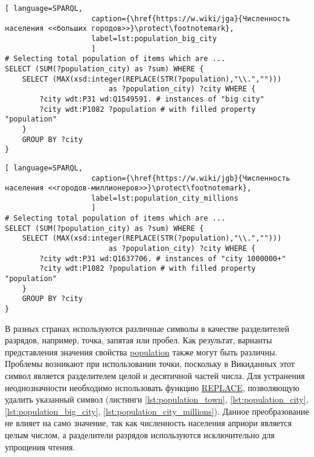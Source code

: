 \begin{lstlisting}[ language=SPARQL, 
                    caption={\href{https://w.wiki/jga}{Численность населения <<больших городов>>}\protect\footnotemark},
                    label=lst:population_big_city
                    ]
# Selecting total population of items which are ...
SELECT (SUM(?population_city) as ?sum) WHERE {                    
	SELECT (MAX(xsd:integer(REPLACE(STR(?population),"\\.",""))) 
						as ?population_city) ?city WHERE {
		?city wdt:P31 wd:Q1549591. # instances of "big city"
		?city wdt:P1082 ?population # with filled property "population"
	}
	GROUP BY ?city
}
\end{lstlisting}

\begin{lstlisting}[ language=SPARQL, 
                    caption={\href{https://w.wiki/jgb}{Численность населения <<городов-миллионеров>>}\protect\footnotemark},
                    label=lst:population_city_millions
                    ]
# Selecting total population of items which are ...
SELECT (SUM(?population_city) as ?sum) WHERE {
	SELECT (MAX(xsd:integer(REPLACE(STR(?population),"\\.",""))) 
						as ?population_city) ?city WHERE {
		?city wdt:P31 wd:Q1637706. # instances of "city 1000000+"
		?city wdt:P1082 ?population # with filled property "population"
	}
	GROUP BY ?city
}
\end{lstlisting}

В разных странах используются различные символы в качестве разделителей разрядов, например, точка, запятая или пробел. Как результат, варианты представления значения свойства \href{https://www.wikidata.org/wiki/Property:P1082}{population} также могут быть различны. Проблемы возникают при использовании точки, поскольку в Викиданных этот символ является разделителем целой и десятичной частей числа. Для устранения неоднозначности необходимо использовать функцию \href{https://en.wikibooks.org/wiki/SPARQL/Expressions\_and\_Functions\#REPLACE}{REPLACE}, позволяющую удалить указанный символ (листинги \ref{lst:population_town}, \ref{lst:population_city}, \ref{lst:population_big_city}, \ref{lst:population_city_millions}). Данное преобразование не влияет на само значение, так как численность населения априори является целым числом, а разделители разрядов используются исключительно для упрощения чтения.

